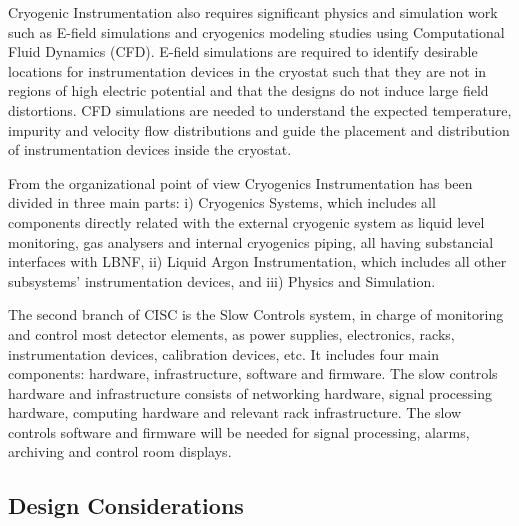 Cryogenic Instrumentation also requires significant physics and
simulation work such as E-field simulations and cryogenics modeling
studies using Computational Fluid Dynamics (CFD). E-field simulations
are required to identify desirable locations for instrumentation
devices in the cryostat such that they are not in regions of high electric potential and
that the designs do not induce large field distortions. CFD
simulations are needed to understand the expected temperature,
impurity and velocity flow distributions and guide the placement and
distribution of instrumentation devices inside the cryostat.


From the organizational point of view
Cryogenics Instrumentation has been divided in three main parts: i) Cryogenics Systems, which includes all components directly related with the external cryogenic system as
liquid level monitoring, gas analysers and internal cryogenics piping, all having substancial interfaces with LBNF, ii) Liquid Argon Instrumentation, which includes all
other subsystems' instrumentation devices, and iii) Physics and Simulation.


The second branch of CISC is the Slow Controls system, in charge of monitoring and control most detector elements, as power supplies, electronics, racks, instrumentation devices,
calibration devices, etc. It includes four main components: hardware, infrastructure,
software and firmware. The slow controls hardware and infrastructure consists of
networking hardware, signal processing hardware, computing hardware and relevant
rack infrastructure. The slow controls software and firmware will be needed for
signal processing, alarms, archiving and control room displays.



\subsection{Design Considerations}
\label{sec:fdsp-slow-cryo-des-consid}


